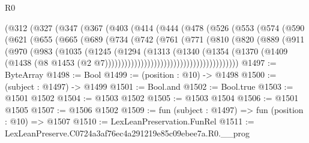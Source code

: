 \begin{lexlean}{R0}
\begin{coremodule}
            (@312
              (@327
                (@347
                  (@367
                    (@403
                      (@414
                        (@444
                          (@478
                            (@526
                              (@553
                                (@574
                                  (@590
                                    (@621
                                      (@655
                                        (@665
                                          (@689
                                            (@734
                                              (@742
                                                (@761
                                                  (@771
                                                    (@810
                                                      (@820
                                                        (@889
                                                          (@911
                                                            (@970
                                                              (@983
                                                                (@1035
                                                                  (@1245
                                                                    (@1294
                                                                      (@1313
                                                                        (@1340
                                                                          (@1354
                                                                            (@1370
                                                                              (@1409
                                                                                (@1438
                                                                                  (@8
                                                                                    @1453
                                                                                    (@2
                                                                                      @7)))))))))))))))))))))))))))))))))))))))))
@1497 := ByteArray
@1498 := Bool
@1499 := (position : @10) -> @1498
@1500 := (subject : @1497) -> @1499
@1501 := Bool.and
@1502 := Bool.true
@1503 := @1501 @1502
@1504 := @1503 @1502
@1505 := @1503 @1504
@1506 := @1501 @1505
@1507 := @1506 @1502
@1509 := fun (subject : @1497) => fun (position : @10) => @1507
@1510 := LexLeanPreservation.FunRel
@1511 := LexLeanPreserve.C0724a3af76ec4a291219e85c09ebee7a.R0.__prog

\end{coremodule}
\end{lexlean}
